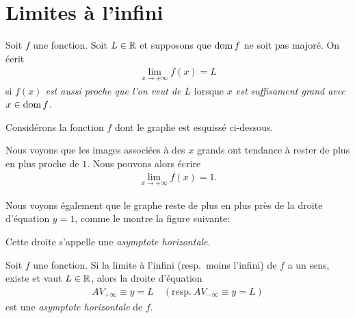 \documentclass[main.tex]{subfiles}
\begin{document}
\section{Limites à l'infini}

\begin{definition}

    Soit $f$ une fonction.
    Soit $L \in \mathbb{R}$ et supposons que $\operatorname{dom} f$ ne soit pas majoré.
    On écrit
    \begin{align}
        \lim_{x \to +\infty} f(x) = L
    \end{align}
    si \emph{$f(x)$ est aussi proche que l'on veut de $L$}
    lorsque \emph{$x$ est suffisament grand avec $x \in \operatorname{dom} f$}.
\end{definition}

\begin{example}

    Considérons la fonction $f$ dont le graphe est esquissé ci-dessous.
    \begin{center}
        \begin{plot}{0.25}{-1}{-3}{30}{5}
        \end{plot}
    \end{center}

    Nous voyons que les images associées à des $x$ grands ont tendance à rester de plus en plus proche de $1$.
    Nous pouvons alors écrire
    \begin{align*}
        \lim_{x \to +\infty} f(x) = 1.
    \end{align*}

    Nous voyons également que le graphe reste de plus en plus près de la droite d'équation $y = 1$,
    comme le montre la figure suivante:
    \begin{center}
        \begin{plot}{0.25}{-1}{-3}{30}{5}
        \end{plot}
    \end{center}

    Cette droite s'appelle une \emph{asymptote horizontale}.
\end{example}

\begin{definition}

    Soit $f$ une fonction.
    Si la limite à l'infini (resp.\ moins l'infini) de $f$ a un sens, existe et vaut $L \in \mathbb{R}$,
    alors la droite d'équation
    \begin{align}
        AV_{+\infty} \equiv y = L
        \quad
        \left(\text{resp.}\ AV_{-\infty} \equiv y = L\right)
    \end{align}
    est une \emph{asymptote horizontale} de $f$.
\end{definition}
\end{document}
